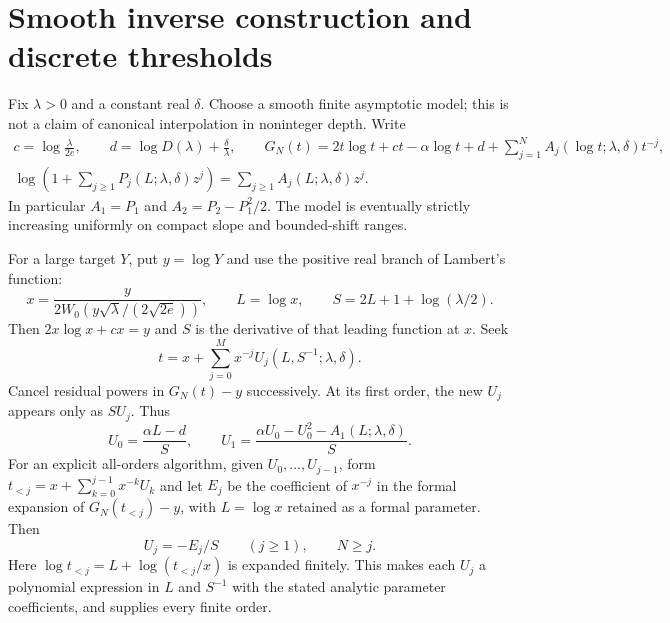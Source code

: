 \documentclass[11pt,letterpaper]{article}
\theoremstyle{remark}\newtheorem{remark}[theorem]{Remark}
\begin{document}
\section{Smooth inverse construction and discrete thresholds}\label{ibd:pd:sec:inverse}
Fix $\lambda>0$ and a constant real $\delta$. Choose a smooth finite asymptotic model; this is not a claim of canonical interpolation in noninteger depth. Write
\begin{gather}\label{ibd:pd:eq:logmodel}
 c=\log\frac{\lambda}{2e},\qquad
 d=\log D(\lambda)+\frac\delta\lambda,\qquad
 G_N(t)=2t\log t+ct-\alpha\log t+d+
 \sum_{j=1}^N A_j(\log t;\lambda,\delta)t^{-j},\\
 \log\left(1+\sum_{j\geq1}P_j(L;\lambda,\delta)z^j\right)
 =\sum_{j\geq1}A_j(L;\lambda,\delta)z^j.\nonumber
\end{gather}
In particular $A_1=P_1$ and $A_2=P_2-P_1^2/2$. The model is eventually strictly increasing uniformly on compact slope and bounded-shift ranges.

For a large target $Y$, put $y=\log Y$ and use the positive real branch of Lambert's function:
\begin{equation}\label{ibd:pd:eq:Lambert}
 x=\frac{y}{2W_0\!\left(y\sqrt\lambda/(2\sqrt{2e})\right)},\qquad
 L=\log x,\qquad S=2L+1+\log(\lambda/2).
\end{equation}
Then $2x\log x+cx=y$ and $S$ is the derivative of that leading function at $x$. Seek
\begin{equation}\label{ibd:pd:eq:inverse}
 t=x+\sum_{j=0}^M x^{-j}U_j(L,S^{-1};\lambda,\delta).
\end{equation}
Cancel residual powers in $G_N(t)-y$ successively. At its first order, the new $U_j$ appears only as $S U_j$. Thus
\begin{equation}\label{ibd:pd:eq:U01}
 U_0=\frac{\alpha L-d}{S},\qquad
 U_1=\frac{\alpha U_0-U_0^2-A_1(L;\lambda,\delta)}{S}.
\end{equation}
For an explicit all-orders algorithm, given $U_0,\dots,U_{j-1}$, form
$t_{<j}=x+\sum_{k=0}^{j-1}x^{-k}U_k$ and let $E_j$ be the coefficient of $x^{-j}$ in the formal expansion of $G_N(t_{<j})-y$, with $L=\log x$ retained as a formal parameter. Then
\begin{equation}\label{ibd:pd:eq:Urec}
 U_j=-E_j/S\qquad(j\geq1),\qquad N\geq j.
\end{equation}
Here $\log t_{<j}=L+\log(t_{<j}/x)$ is expanded finitely. This makes each $U_j$ a polynomial expression in $L$ and $S^{-1}$ with the stated analytic parameter coefficients, and supplies every finite order.
\end{document}
